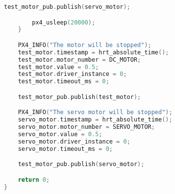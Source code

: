 \begin{lstlisting}[language=c++,caption=Part 1 Code, label=list:part1]
        test_motor_pub.publish(servo_motor);

        px4_usleep(20000);
    }

    PX4_INFO("The motor will be stopped");
    test_motor.timestamp = hrt_absolute_time();
    test_motor.motor_number = DC_MOTOR;
    test_motor.value = 0.5;
    test_motor.driver_instance = 0;
    test_motor.timeout_ms = 0;

    test_motor_pub.publish(test_motor);

    PX4_INFO("The servo motor will be stopped");
    servo_motor.timestamp = hrt_absolute_time();
    servo_motor.motor_number = SERVO_MOTOR;
    servo_motor.value = 0.5;
    servo_motor.driver_instance = 0;
    servo_motor.timeout_ms = 0;

    test_motor_pub.publish(servo_motor);

    return 0;
}
\end{lstlisting}
